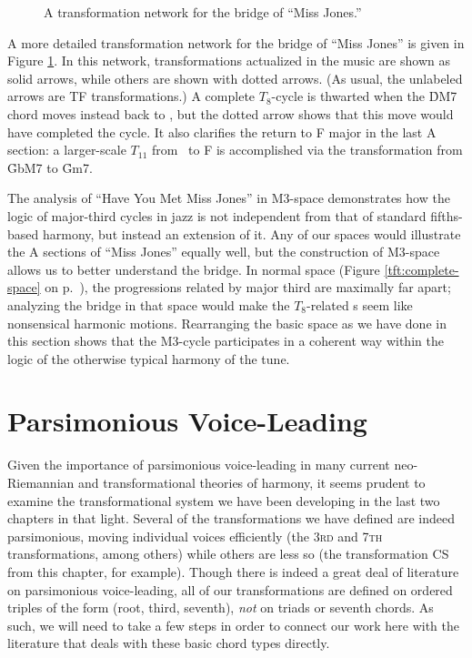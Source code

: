 \begin{figure}[tbp]
  \caption{A transformation network for the bridge of ``Miss Jones.''}
\label{maj3:miss-jones-bridge}
\end{figure}

A more detailed transformation network for the bridge of ``Miss Jones'' is
given in Figure \ref{maj3:miss-jones-bridge}. In this network,
transformations actualized in the music are shown as solid arrows, while
others are shown with dotted arrows. (As usual, the unlabeled arrows are TF
transformations.) A complete $T_8$-cycle is thwarted when the \h{DM7} chord
moves instead back to \Gflat, but the dotted arrow shows that this move would
have completed the cycle. It also clarifies the return to F major in the last
A section: a larger-scale $T_{11}$ from \Gflat\ to F is accomplished via the
\slideS transformation from \h{GbM7} to \h{Gm7}.

The analysis of ``Have You Met Miss Jones'' in M3-space demonstrates how the
logic of major-third cycles in jazz is not independent from that of standard
fifths-based harmony, but instead an extension of it. Any of our spaces would
illustrate the A sections of ``Miss Jones'' equally well, but the construction
of M3-space allows us to better understand the bridge. In normal \tf space
(Figure \ref{tft:complete-space} on p.~\pageref{tft:complete-space}), the \tfo
progressions related by major third are maximally far apart; analyzing the
bridge in that space would make the $T_8$-related \tfo{}s seem like
nonsensical harmonic motions. Rearranging the basic space as we have done in
this section shows that the M3-cycle participates in a coherent way within the
logic of the otherwise typical harmony of the tune.

\section{Parsimonious Voice-Leading}
\label{sec:parsimony}

Given the importance of parsimonious voice-leading in many current
neo-Riemannian and transformational theories of harmony, it seems prudent to
examine the transformational system we have been developing in the last two
chapters in that light. Several of the transformations we have defined are
indeed parsimonious, moving individual voices efficiently (the \textsc{3rd}
and \textsc{7th} transformations, among others) while others are less so (the
transformation CS from this chapter, for example). Though there is indeed a
great deal of literature on parsimonious voice-leading, all of our
transformations are defined on ordered triples of the form (root, third,
seventh), \emph{not} on triads or seventh chords. As such, we will need to
take a few steps in order to connect our work here with the literature that
deals with these basic chord types directly.

